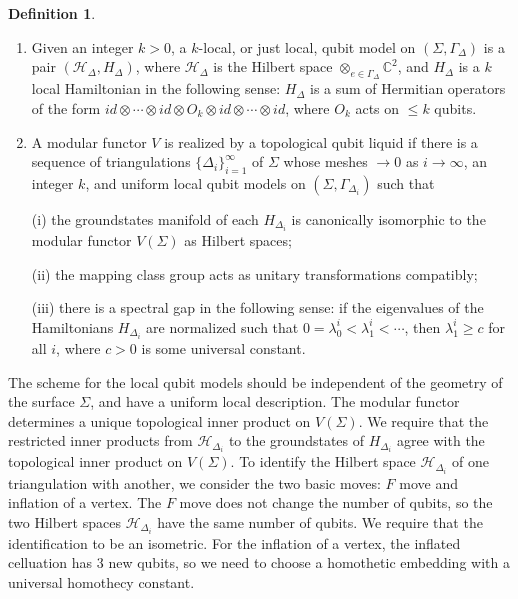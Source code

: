 \documentclass[12pt,psamsfonts]{amsart}
\newcommand{\C}{\mathbb C}
\newcommand{\mH}{\mathcal{H}}
\numberwithin{equation}{section}
\theoremstyle{definition}
\newtheorem{definition}[theorem]{Definition}
\begin{document}
 \begin{definition}

 \begin{enumerate}

 \item Given an integer $k>0$, a $k$-local, or just local, qubit model on
 $(\Sigma,\Gamma_{\Delta})$ is a pair $(\mH_{\Delta},H_{\Delta})$,
 where $\mH_{\Delta}$ is the Hilbert space
 $\otimes_{e\in \Gamma_{\Delta}} \C^2$, and $H_{\Delta}$ is a $k$ local Hamiltonian
  in the following sense: $H_{\Delta}$ is a sum of Hermitian operators of the form
 $id \otimes \cdots \otimes id \otimes O_k \otimes id \otimes \cdots
 \otimes id$, where $O_k$ acts on $\leq k$ qubits.

 \item A modular functor $V$ is realized by a topological qubit
 liquid if there is a sequence of triangulations
 $\{\Delta_i\}_{i=1}^{\infty}$ of
 $\Sigma$ whose meshes $\rightarrow 0$ as $i\rightarrow \infty$, an integer $k$, and uniform
 local qubit models on $(\Sigma,\Gamma_{\Delta_i})$ such that

 (i) the groundstates manifold of each $H_{\Delta_i}$ is canonically isomorphic
 to the modular functor $V(\Sigma)$ as Hilbert spaces;

 (ii) the mapping class group acts as unitary transformations compatibly;

 (iii) there is a spectral gap in the following sense: if the
 eigenvalues of the Hamiltonians $H_{\Delta_i}$ are normalized such that $0=\lambda_0^i<
 \lambda_1^i < \cdots$, then $\lambda_1^i \geq c$ for all $i$,
 where $c>0$ is some universal constant.

 \end{enumerate}


 \end{definition}

 The scheme for the
 local qubit models should be independent
 of the geometry of the surface $\Sigma$, and have a uniform local description.
 The modular functor determines
 a unique topological inner product on $V(\Sigma)$.  We require
 that the restricted inner products from
 $\mH_{\Delta_i}$ to the groundstates of $H_{\Delta_i}$ agree with the topological inner product on $V(\Sigma)$.
 To identify the
 Hilbert space $\mH_{\Delta_i}$ of one triangulation with another,
 we consider the two basic moves: $F$ move and inflation of a vertex.
  The $F$ move does not change the number of qubits, so the two
  Hilbert spaces $\mH_{\Delta_i}$ have the same number of qubits.  We require that the
  identification to be an isometric.  For the inflation of a vertex,
  the inflated celluation has $3$ new qubits, so we need to choose a homothetic
  embedding with a universal homothecy constant.
\end{document}

